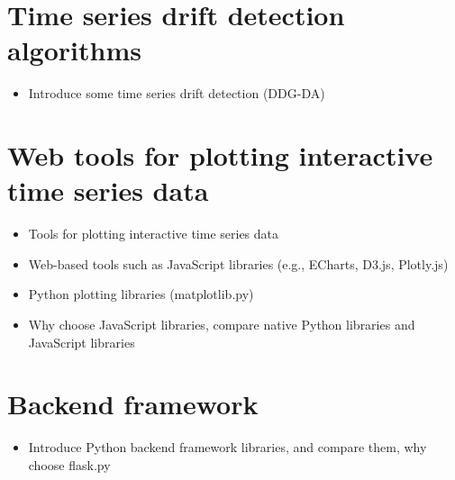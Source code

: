 \section{Time series drift detection algorithms}
\begin{itemize}
    \item Introduce some time series drift detection (DDG-DA)
\end{itemize}


\section{Web tools for plotting interactive time series data}
\begin{itemize}
    \item Tools for plotting interactive time series data
    \item Web-based tools such as JavaScript libraries (e.g., ECharts, D3.js, Plotly.js)
    \item Python plotting libraries (matplotlib.py)
    \item Why choose JavaScript libraries, compare native Python libraries and JavaScript libraries
\end{itemize}

\section{Backend framework}
\begin{itemize}
    \item Introduce Python backend framework libraries, and compare them, why choose flask.py
\end{itemize}


